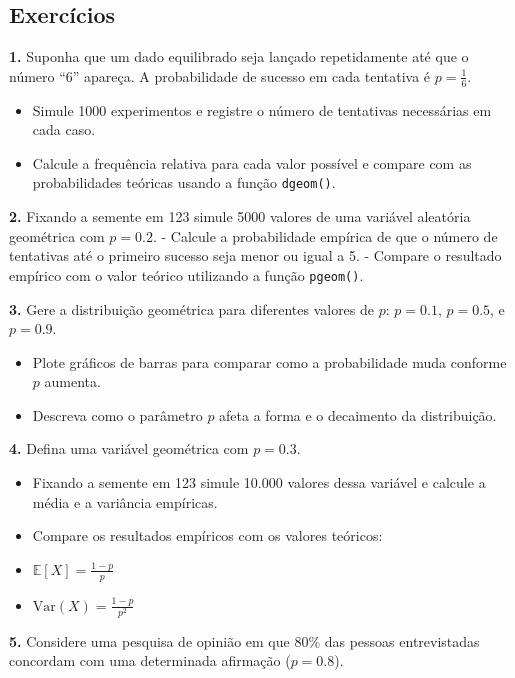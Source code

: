 \documentclass[
]{book}
\providecommand{\tightlist}{%
  \setlength{\itemsep}{0pt}\setlength{\parskip}{0pt}}
\begin{document}
\subsection{Exercícios}\label{exercuxedcios-27}

\textbf{1.} Suponha que um dado equilibrado seja lançado repetidamente até que o número ``6'' apareça. A probabilidade de sucesso em cada tentativa é \(p = \frac{1}{6}\).

\begin{itemize}
\tightlist
\item
  Simule 1000 experimentos e registre o número de tentativas necessárias em cada caso.
\item
  Calcule a frequência relativa para cada valor possível e compare com as probabilidades teóricas usando a função \texttt{dgeom()}.
\end{itemize}

\textbf{2.} Fixando a semente em 123 simule 5000 valores de uma variável aleatória geométrica com \(p = 0.2\).
- Calcule a probabilidade empírica de que o número de tentativas até o primeiro sucesso seja menor ou igual a 5.
- Compare o resultado empírico com o valor teórico utilizando a função \texttt{pgeom()}.

\textbf{3.} Gere a distribuição geométrica para diferentes valores de \(p\): \(p= 0.1\), \(p = 0.5\), e \(p = 0.9\).

\begin{itemize}
\tightlist
\item
  Plote gráficos de barras para comparar como a probabilidade muda conforme \(p\) aumenta.
\item
  Descreva como o parâmetro \(p\) afeta a forma e o decaimento da distribuição.
\end{itemize}

\textbf{4.} Defina uma variável geométrica com \(p = 0.3\).

\begin{itemize}
\tightlist
\item
  Fixando a semente em 123 simule 10.000 valores dessa variável e calcule a média e a variância empíricas.
\item
  Compare os resultados empíricos com os valores teóricos:
\item
  \(\mathbb{E}[X] = \frac{1-p}{p}\)
\item
  \(\text{Var}(X) = \frac{1-p}{p^2}\)
\end{itemize}

\textbf{5.} Considere uma pesquisa de opinião em que 80\% das pessoas entrevistadas concordam com uma determinada afirmação (\(p = 0.8\)).
\end{document}
